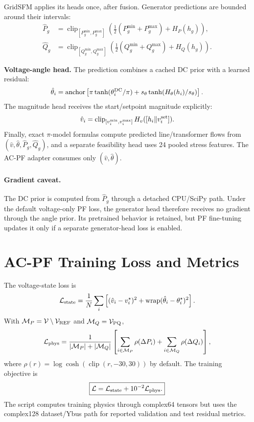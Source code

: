 \documentclass[10pt]{article}
\newcommand{\wrap}{\operatorname{wrap}}
\begin{document}
GridSFM applies its heads once, after fusion. Generator predictions are bounded
around their intervals:
\begin{align}
 \hat P_g&=\operatorname{clip}_{[P_g^{\min},P_g^{\max}]}
 \left(\tfrac12(P_g^{\min}+P_g^{\max})+H_P(h_g)\right),\\
 \hat Q_g&=\operatorname{clip}_{[Q_g^{\min},Q_g^{\max}]}
 \left(\tfrac12(Q_g^{\min}+Q_g^{\max})+H_Q(h_g)\right).
\end{align}
\par\nopagebreak[4]
\textbf{Voltage-angle head.} The prediction combines a cached DC prior with a
learned residual:
\begin{equation}
 \hat\theta_i=\operatorname{anchor}\left[
 \pi\tanh(\theta_i^{\rm DC}/\pi)+s_\theta\tanh(H_\theta(h_i)/s_\theta)
 \right].
\end{equation}
The magnitude head receives the start/setpoint magnitude explicitly:
\begin{equation}
 \hat v_i=\operatorname{clip}_{[v_i^{\min},v_i^{\max}]}
 H_v([h_i\Vert v_i^{\rm set}]).
\end{equation}
Finally, exact \(\pi\)-model formulas compute predicted line/transformer flows
from \((\hat v,\hat\theta,\hat P_g,\hat Q_g)\), and a separate feasibility head
uses 24 pooled stress features. The AC-PF adapter consumes only
\((\hat v,\hat\theta)\).

\paragraph{Gradient caveat.}
The DC prior is computed from \(\hat P_g\) through a detached CPU/SciPy path.
Under the default voltage-only PF loss, the generator head therefore receives no
gradient through the angle prior. Its pretrained behavior is retained, but PF
fine-tuning updates it only if a separate generator-head loss is enabled.

\section{AC-PF Training Loss and Metrics}

The voltage-state loss is
\begin{equation}
 \mathcal L_{\rm state}=\frac1N\sum_i
 \left[(\hat v_i-v_i^\star)^2+\wrap(\hat\theta_i-\theta_i^\star)^2\right].
\end{equation}
With \(\mathcal M_P=\mathcal V\setminus\mathcal V_{\rm REF}\) and
\(\mathcal M_Q=\mathcal V_{\rm PQ}\),
\begin{equation}
 \mathcal L_{\rm phys}=\frac{1}{|\mathcal M_P|+|\mathcal M_Q|}
 \left[\sum_{i\in\mathcal M_P}\rho(\Delta P_i)+
 \sum_{i\in\mathcal M_Q}\rho(\Delta Q_i)\right],
\end{equation}
where \(\rho(r)=\log\cosh(\operatorname{clip}(r,-30,30))\) by default. The
training objective is
\begin{equation}
 \boxed{\mathcal L=\mathcal L_{\rm state}+10^{-2}\mathcal L_{\rm phys}.}
\end{equation}
The script computes training physics through complex64 tensors but uses the
complex128 dataset/Ybus path for reported validation and test residual metrics.
\end{document}
